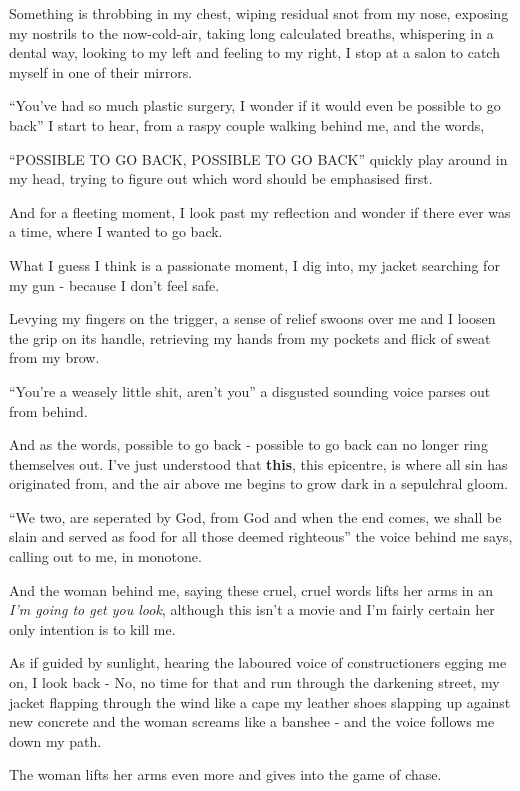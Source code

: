 \documentclass[19pt,openany]{book}
\begin{document}
Something is throbbing in my chest, wiping residual
snot from my nose, exposing
my nostrils to the now-cold-air,
taking
long calculated breaths, whispering
in a dental way, looking to my left and feeling to my right,
I stop at a salon to catch myself in one of their mirrors.

``You've had so much plastic surgery, I wonder
if it would even be possible to go back'' I start
to hear, from a raspy
couple walking behind me, and
the words,

``POSSIBLE TO GO BACK, POSSIBLE TO GO BACK''
quickly play
around in my head, trying to figure out which word
should be emphasised first.

And for a fleeting moment, I look past my reflection
and wonder if there ever was a time, where
I wanted to go back.

What I guess I think is a passionate
moment, I dig into, my jacket
searching for my gun - because I don't
feel safe.

Levying my fingers on the
trigger, a sense of relief
swoons over me and I loosen
the grip on its handle, retrieving
my hands from my pockets and flick
of sweat from my brow.

``You're a weasely little shit, aren't you'' a disgusted
sounding voice
parses out from behind.

And as the words, possible to
go back - possible to go back
can no longer ring themselves
out. I've just
understood that \textbf{this}, this
epicentre, is where all sin has originated from,
and the air above
me begins
to grow dark in a sepulchral gloom.

``We two, are seperated by
God, from God and when the end comes, we shall
be slain and served as food
for all those deemed righteous''
the voice behind me says,
calling out to me, in monotone.

And the woman behind me,
saying these cruel, cruel words
lifts her arms in an
\textit{I'm going to get you
look}, although this isn't
a movie and I'm fairly
certain her only intention
is to kill me.

As if guided by sunlight, hearing
the laboured voice of constructioners
egging me on, I look back - No, no time for that
and run through the darkening
street, my jacket flapping through the
wind like a cape my leather shoes slapping up
against new concrete and the woman
screams like a banshee - and the
voice follows me down my path.

The woman lifts her arms
even more
and gives into the game
of chase.
\end{document}
